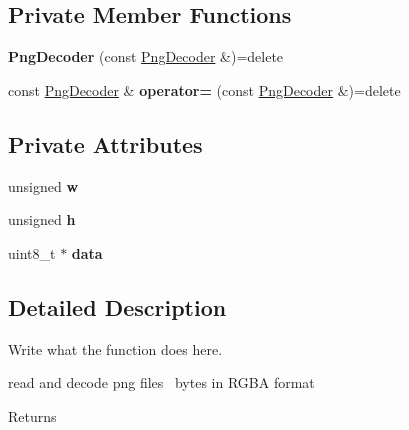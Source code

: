 \subsection*{Private Member Functions}
\begin{DoxyCompactItemize}
\item 
\hypertarget{classPngDecoder_a593683f3ab43f058ad6623bf9a0cc101}{{\bfseries Png\+Decoder} (const \hyperlink{classPngDecoder}{Png\+Decoder} \&)=delete}\label{classPngDecoder_a593683f3ab43f058ad6623bf9a0cc101}

\item 
\hypertarget{classPngDecoder_a930e1427fb5ad61dca776f458ca99b06}{const \hyperlink{classPngDecoder}{Png\+Decoder} \& {\bfseries operator=} (const \hyperlink{classPngDecoder}{Png\+Decoder} \&)=delete}\label{classPngDecoder_a930e1427fb5ad61dca776f458ca99b06}

\end{DoxyCompactItemize}
\subsection*{Private Attributes}
\begin{DoxyCompactItemize}
\item 
\hypertarget{classPngDecoder_a40f09e2097962ab0c9788a7cf61eacd0}{unsigned {\bfseries w}}\label{classPngDecoder_a40f09e2097962ab0c9788a7cf61eacd0}

\item 
\hypertarget{classPngDecoder_a20aa858e65cb8af05c781f7f4e3a2f50}{unsigned {\bfseries h}}\label{classPngDecoder_a20aa858e65cb8af05c781f7f4e3a2f50}

\item 
\hypertarget{classPngDecoder_a23272dbc35d902b9c2aed79cf9ed40a6}{uint8\+\_\+t $\ast$ {\bfseries data}}\label{classPngDecoder_a23272dbc35d902b9c2aed79cf9ed40a6}

\end{DoxyCompactItemize}


\subsection{Detailed Description}
Write what the function does here. 

read and decode png files~\newline
 bytes in R\+G\+B\+A format \begin{DoxyReturn}{Returns}

\end{DoxyReturn}


